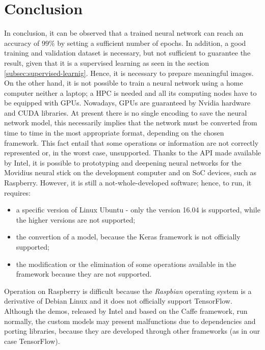 \section{Conclusion}
\label{sec:conclusion}
In conclusion, it can be observed that a trained neural network can reach an 
accuracy of $99\%$ by setting a sufficient number of epochs. In addition, a 
good training and validation dataset is necessary, but not sufficient to 
guarantee the result, given that it is a supervised learning as seen in the 
section \ref{subsec:supervised-learnig}.
Hence, it is necessary to prepare meaningful images.\\
On the other hand, it is not possible to train a neural network using a home 
computer neither a laptop; a HPC is needed and all its computing nodes have to be
equipped with GPUs. 
Nowadays, GPUs are guaranteed by Nvidia hardware and CUDA libraries.
At present there is no single encoding to save the neural network model, this 
necessarily implies that the network must be converted from time to time in 
the most appropriate format, depending on the chosen framework.
This fact entail that some operations or information are not correctly 
represented or, in the worst case, unsupported.
Thanks to the API made available by Intel, it is possible to  
prototyping and deepening neural networks for the Movidius neural stick on the 
 development computer and on SoC devices, such as Raspberry.
However, it is still a  not-whole-developed software; hence, to run, it requires:
\begin{itemize}
\item a specific version of Linux Ubuntu - only the version 16.04 is 
supported, while the higher versions are not supported;
\item the convertion of a model, because the Keras framework is not officially supported;
\item the modification or the elimination of some operations available in the 
framework because they are not supported.
\end{itemize}
Operation on Raspberry is difficult because the \emph{Raspbian} operating system
is a derivative of Debian Linux and it does not officially support TensorFlow.
Although the demos, released by Intel and based on the Caffe framework, run 
normally, the custom models may present malfunctions due to dependencies and 
porting libraries, because they are developed through other frameworks (as in 
our case TensorFlow).
